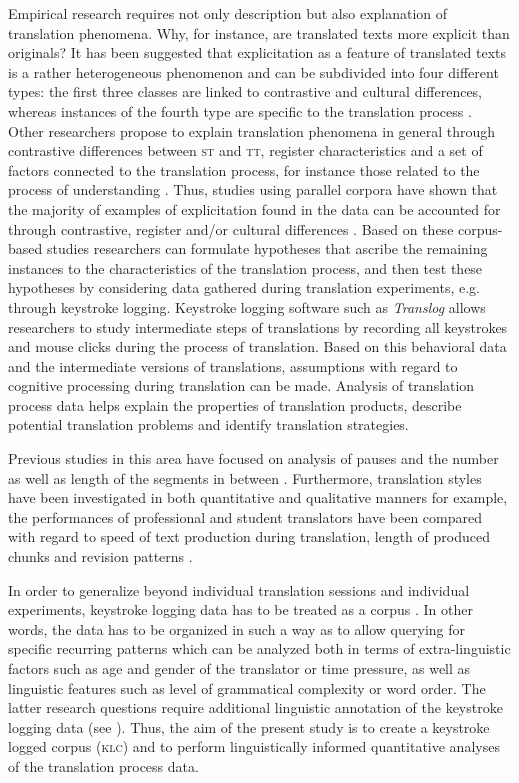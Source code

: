 \documentclass[output=paper]{LSP/langsci}
\begin{document}
Empirical research requires not only description but also explanation of translation phenomena. Why, for instance, are translated texts more explicit than originals? It has been suggested that explicitation as a feature of translated texts is a rather heterogeneous phenomenon and can be subdivided into four different types: the first three classes are linked to contrastive and cultural differences, whereas instances of the fourth type are specific to the translation process \citep[82-83]{Klaudy1998}. Other researchers propose to explain translation phenomena in general through contrastive differences between \textsc{st} and \textsc{tt}, register characteristics and a set of factors connected to the translation process, for instance those related to the process of understanding \citep{Steiner2001}. Thus, studies using parallel corpora have shown that the majority of examples of explicitation found in the data can be accounted for through contrastive, register and/or cultural differences \citep{Hansen-Schirra2007,Becher2010}. Based on these corpus-based studies researchers can formulate hypotheses that ascribe the remaining instances to the characteristics of the translation process, and then test these hypotheses by considering data gathered during translation experiments, e.g. through keystroke logging. Keystroke logging software such as \textit{Translog} \citep{Jakobsen1999} allows researchers to study intermediate steps of translations by recording all keystrokes and mouse clicks during the process of translation. Based on this behavioral data and the intermediate versions of translations, assumptions with regard to cognitive processing during translation can be made. Analysis of translation process data helps explain the properties of translation products, describe potential translation problems and identify translation strategies.

Previous studies in this area have focused on analysis of pauses and the number as well as length of the segments in between \citep[e.g.][]{Dragsted2005,Jakobsen2005,Alves2009,Alves2011}. Furthermore, translation styles have been investigated in both quantitative and qualitative manners \citep[e.g.][]{Pagano2008, CarlandDragsted2011} for example, the performances of professional and student translators have been compared with regard to speed of text production during translation, length of produced chunks and revision patterns \citep[e.g.][]{Jakobsen2005}.
 
In order to generalize beyond individual translation sessions and individual experiments, keystroke logging data has to be treated as a corpus \citep{Alves2004, Alves2009, Alves2011}. In other words, the data has to be organized in such a way as to allow querying for specific recurring patterns \citep{Carl2009} which can be analyzed both in terms of extra-linguistic factors such as age and gender of the translator or time pressure, as well as linguistic features such as level of grammatical complexity or word order. The latter research questions require additional linguistic annotation of the keystroke logging data (see ). Thus, the aim of the present study is to create a keystroke logged corpus (\textsc{klc}) and to perform linguistically informed quantitative analyses of the translation process data.
\end{document}
